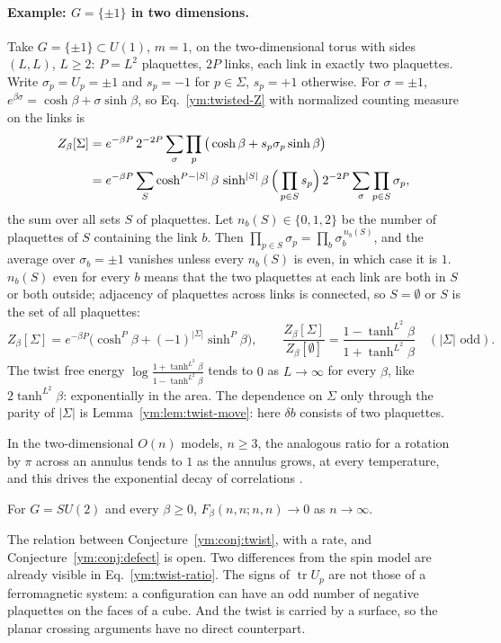 \paragraph{Example: $G=\{\pm1\}$ in two dimensions.}
Take $G=\{\pm1\}\subset U(1)$, $m=1$, on the two-dimensional torus with sides
$(L,L)$, $L\ge2$: $P=L^2$ plaquettes, $2P$ links, each link in exactly two plaquettes.
Write $\sigma_p=U_p=\pm1$ and $s_p=-1$ for $p\in\Sigma$, $s_p=+1$ otherwise.
For $\sigma=\pm1$, $e^{\beta\sigma}=\cosh\beta+\sigma\sinh\beta$, so
Eq.~\eqref{ym:twisted-Z} with normalized counting measure on the links is
\begin{align}
 Z_\beta[\Sigma]
 &=e^{-\beta P}\,2^{-2P}\sum_{\sigma}\prod_p
   \big(\cosh\beta+s_p\sigma_p\sinh\beta\big)\notag\\
 &=e^{-\beta P}\sum_{S}\cosh^{P-|S|}\beta\,\sinh^{|S|}\beta\,
   \Big(\prod_{p\in S}s_p\Big)\,
   2^{-2P}\sum_{\sigma}\prod_{p\in S}\sigma_p ,
 \label{ym:z2-expansion}
\end{align}
the sum over all sets $S$ of plaquettes. Let $n_b(S)\in\{0,1,2\}$ be the
number of plaquettes of $S$ containing the link $b$. Then
$\prod_{p\in S}\sigma_p=\prod_b\sigma_b^{\,n_b(S)}$, and the average over
$\sigma_b=\pm1$ vanishes unless every $n_b(S)$ is even, in which case it is
$1$. $n_b(S)$ even for every $b$ means that the two plaquettes at each link
are both in $S$ or both outside; adjacency of plaquettes across links is
connected, so $S=\emptyset$ or $S$ is the set of all plaquettes:
\begin{equation}\label{ym:z2-closed}
 Z_\beta[\Sigma]=e^{-\beta P}\Big(\cosh^P\beta+(-1)^{|\Sigma|}\sinh^P\beta\Big),
 \qquad
 \frac{Z_\beta[\Sigma]}{Z_\beta[\emptyset]}
 =\frac{1-\tanh^{L^2}\beta}{1+\tanh^{L^2}\beta}\quad(|\Sigma|\text{ odd}).
\end{equation}
The twist free energy
$\log\frac{1+\tanh^{L^2}\beta}{1-\tanh^{L^2}\beta}$ tends to $0$ as
$L\to\infty$ for every $\beta$, like $2\tanh^{L^2}\beta$: exponentially in the
area. The dependence on $\Sigma$ only through the parity of $|\Sigma|$ is
Lemma~\ref{ym:lem:twist-move}: here $\delta b$ consists of two plaquettes.

In the two-dimensional $O(n)$ models, $n\ge3$, the analogous ratio for a
rotation by $\pi$ across an annulus tends to $1$ as the annulus grows, at
every temperature, and this drives the exponential decay of correlations
\cite{OpenAIOn2026}.
\begin{conjecture}\label{ym:conj:twist}
For $G=SU(2)$ and every $\beta\ge0$,
$F_\beta(n,n;n,n)\to0$ as $n\to\infty$.
\end{conjecture}
The relation between Conjecture~\ref{ym:conj:twist}, with a rate, and
Conjecture~\ref{ym:conj:defect} is open. Two
differences from the spin model are already visible in
Eq.~\eqref{ym:twist-ratio}. The signs of $\operatorname{tr}U_p$ are not
those of a ferromagnetic system: a configuration can have an odd number of
negative plaquettes on the faces of a cube. And the twist is carried by a
surface, so the planar crossing arguments have no direct counterpart.

